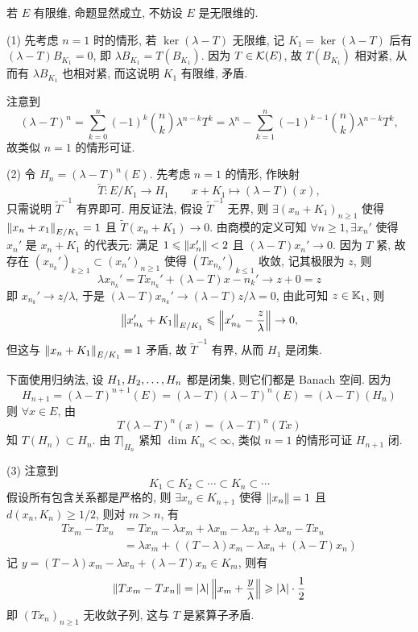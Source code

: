 	\begin{Proof}
		若 $ E $ 有限维, 命题显然成立, 不妨设 $ E $ 是无限维的.

		(1) 先考虑 $ n=1 $ 时的情形, 若 $ \ker(\lambda-T) $ 无限维, 记 $ K_{1}=\ker(\lambda-T) $ 后有 $ (\lambda-T)B_{K_{1}}=0 $, 即 $ \lambda B_{K_{1}}=T(B_{K_{1}}) $. 因为 $ T\in\mathcal{K}(E) $, 故 $ T(B_{K_{1}}) $ 相对紧, 从而有 $ \lambda B_{K_{1}} $ 也相对紧, 而这说明 $ K_{1} $ 有限维, 矛盾.
		
		注意到 
		\[
			(\lambda-T)^{n}=\sum_{k=0}^{n}(-1)^{k}\binom{n}{k}\lambda^{n-k}T^{k} = \lambda^{n}-\sum_{k=1}^{n}(-1)^{k-1}\binom{n}{k}\lambda^{n-k}T^{k},
		\]
		故类似 $ n=1 $ 的情形可证.

		(2) 令 $ H_{n}= (\lambda-T)^{n}(E) $. 先考虑 $ n=1 $ 的情形, 作映射
		\[
			\tilde{T}: E/K_{1}\to H_{1}\qquad x+K_{1}\mapsto (\lambda-T)(x),
		\]
		只需说明 $ \tilde{T}^{-1} $ 有界即可. 用反证法, 假设 $ \tilde{T}^{-1} $ 无界, 则 $ \exists (x_{n}+K_{1})_{n\geqslant1} $ 使得 $ \left\| x_{n}+x_{1} \right\|_{E/K_{1}}=1 $ 且 $ \tilde{T}(x_{n}+K_{1})\to 0 $. 由商模的定义可知 $ \forall n\geqslant1, \exists x_{n}' $ 使得  $ x_{n}' $ 是 $ x_{n}+K_{1} $ 的代表元: 满足 $ 1\leqslant\left\| x_{n}' \right\|<2 $ 且 $ (\lambda-T)x_{n}'\to 0 $. 因为 $ T $ 紧, 故存在 $ (x_{n_{k}}')_{k\geqslant1}\subset(x_{n}')_{n\geqslant1} $ 使得 $ (Tx_{n_{k}}')_{k\leqslant1} $ 收敛, 记其极限为 $ z $, 则
		\[
			\lambda x_{n_{k}}'=Tx_{n_{k}}'+(\lambda-T)x-{n_{k}}'\to z+0=z
		\]
		即 $ x_{n_{k}}'\to z/\lambda $, 于是 $ (\lambda-T)x_{n_{k}}'\to (\lambda-T)z/\lambda=0 $, 由此可知 $ z\in\mathbb{K}_{1} $, 则
		\[
			\left\| x_{n_{k}}'+K_{1} \right\|_{E/K_{1}}\leqslant\left\| x_{n_{k}}'-\frac{z}{\lambda} \right\|\to 0,
		\]
		但这与 $ \left\| x_{n}+K_{1} \right\|_{E/K_{1}}=1 $ 矛盾, 故 $ \tilde{T}^{-1} $ 有界, 从而 $ H_{1} $ 是闭集.

		下面使用归纳法, 设 $ H_{1}, H_{2}, \dots, H_{n} $ 都是闭集, 则它们都是 Banach 空间. 因为
		\[
			H_{n+1}=(\lambda-T)^{n+1}(E)=(\lambda-T)(\lambda-T)^{n}(E)=(\lambda-T)(H_{n})
		\]
		则 $ \forall x\in E $, 由
		\[
			T(\lambda-T)^{n}(x)=(\lambda-T)^{n}(Tx)
		\]
		知 $ T(H_{n})\subset H_{n} $. 由 $ T|_{H_{n}} $ 紧知 $ \dim K_{n}<\infty $, 类似 $ n=1 $ 的情形可证 $ H_{n+1} $ 闭.

		(3) 注意到
		\[
			K_{1}\subset K_{2}\subset\cdots\subset K_{n}\subset\cdots
		\]
		假设所有包含关系都是严格的, 则 $ \exists x_{n}\in K_{n+1} $ 使得 $ \left\| x_{n} \right\|=1 $ 且 $ d(x_{n}, K_{n})\geqslant1/2 $, 则对 $ m>n $, 有
		\[
			\begin{aligned}
				Tx_{m}-Tx_{n} & = Tx_{m}-\lambda x_{m}+\lambda x_{m}-\lambda x_{n}+\lambda x_{n}-Tx_{n}\\
				& = \lambda x_{m}+((T-\lambda)x_{m}-\lambda x_{n}+(\lambda-T)x_{n})
			\end{aligned}
		\]
		记 $ y=(T-\lambda)x_{m}-\lambda x_{n}+(\lambda-T)x_{n}\in K_{m} $, 则有
		\[
			\left\| Tx_{{m}}-Tx_{n} \right\|=\left| \lambda \right| \left\| x_{m}+\frac{y}{\lambda} \right\|\geqslant\left| \lambda \right| \cdot\frac{1}{2}
		\]
		即 $ (Tx_{n})_{n\geqslant1} $ 无收敛子列, 这与 $ T $ 是紧算子矛盾.


\end{Proof}

